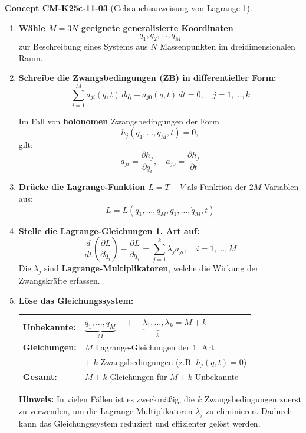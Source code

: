 \documentclass[10pt, letterpaper]{article}
\newcommand{\CustomHeading}[3]{%
  \par\medskip\noindent%
  \textbf{#1 #2} \textnormal{(#3)}.\enskip%
}
\newenvironment{CONC}[2]{\CustomHeading{Concept}{#1}{#2}}{}
\begin{document}
\begin{CONC}{CM-K25c-11-03}{Gebrauchsanweisung von Lagrange 1}
\begin{enumerate}[label=\textbf{\arabic*)}, itemsep=1.5em]

\item \textbf{Wähle \( M = 3N \) geeignete generalisierte Koordinaten}  
\[
q_1, q_2, \dotsc, q_M
\]
zur Beschreibung eines Systems aus \( N \) Massenpunkten im dreidimensionalen Raum.

\item \textbf{Schreibe die Zwangsbedingungen (ZB) in differentieller Form:}
\[
\sum_{i=1}^M a_{ji}(q, t) \, dq_i + a_{j0}(q, t)\, dt = 0, \quad j = 1, \dotsc, k
\]

Im Fall von \textbf{holonomen} Zwangsbedingungen der Form
\[
h_j(q_1, \dotsc, q_M, t) = 0,
\]
gilt:
\[
a_{ji} = \frac{\partial h_j}{\partial q_i}, 
\quad
a_{j0} = \frac{\partial h_j}{\partial t}
\]

\item \textbf{Drücke die Lagrange-Funktion \( L = T - V \)} als Funktion der \( 2M \) Variablen aus:
\[
L = L(q_1, \dotsc, q_M, \dot{q}_1, \dotsc, \dot{q}_M, t)
\]

\item \textbf{Stelle die Lagrange-Gleichungen 1. Art auf:}
\[
\frac{d}{dt} \left( \frac{\partial L}{\partial \dot{q}_i} \right) 
- \frac{\partial L}{\partial q_i} 
= \sum_{j=1}^k \lambda_j a_{ji}, 
\quad i = 1, \dotsc, M
\]
Die \(\lambda_j\) sind \textbf{Lagrange-Multiplikatoren}, welche die Wirkung der Zwangskräfte erfassen.

\item \textbf{Löse das Gleichungssystem:}

\vspace{0.5em}
\noindent
\begin{tabular}{@{}ll}
\textbf{Unbekannte:} 
& \( \underbrace{q_1, \dotsc, q_M}_{M} 
\quad + \quad 
\underbrace{\lambda_1, \dotsc, \lambda_k}_{k} 
= M + k \) \\[1ex]

\textbf{Gleichungen:} 
& \( M \) Lagrange-Gleichungen der 1. Art \\[0.5ex]
& \( + \; k \) Zwangsbedingungen (z.B. \( h_j(q, t) = 0 \)) \\[1ex]

\textbf{Gesamt:} 
& \( M + k \) Gleichungen für \( M + k \) Unbekannte
\end{tabular}

\vspace{1.5em}
\noindent
\textbf{Hinweis:}  
In vielen Fällen ist es zweckmäßig, die \( k \) Zwangsbedingungen zuerst zu verwenden, um die Lagrange-Multiplikatoren \( \lambda_j \) zu eliminieren. Dadurch kann das Gleichungssystem reduziert und effizienter gelöst werden.

\end{enumerate}
\end{CONC}
\end{document}
